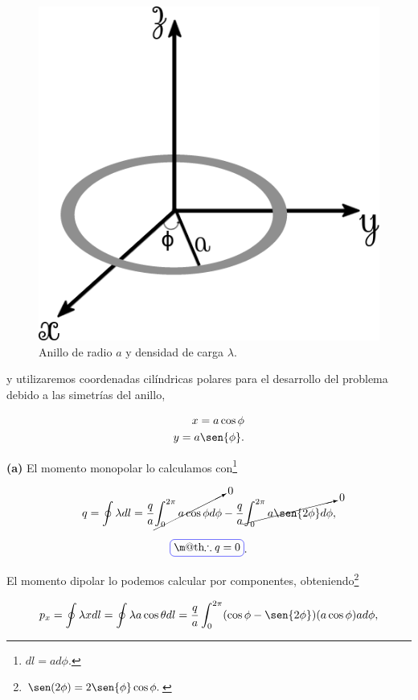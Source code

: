\documentclass[a4paper,11pt]{article}
\makeatletter
\numberwithin{equation}{section}
\newcommand*{\boxcolor}{blue}
\renewcommand{\boxed}[1]{\textcolor{\boxcolor}{%
\tikz[baseline={([yshift=-1ex]current bounding box.center)}] \node [rectangle, minimum width=1ex,rounded corners,draw] {\normalcolor\m@th$\displaystyle#1$};}}
\makeatother
\begin{document}
\begin{figure}[H]
 \center 
 \includegraphics[scale=0.5]{problema8fig1}
 \caption{Anillo de radio $a$ y densidad de carga $\lambda$.}
\end{figure}

y utilizaremos coordenadas cilíndricas polares para el desarrollo del problema debido 
a las simetrías del anillo, 

\begin{align*}
 x = a\cos{\phi} \\
 y = a\sen{\phi}.
\end{align*}

\textbf{(a)} El momento monopolar lo calculamos con\footnote{$dl = ad\phi$.}

\begin{equation}
 q = \oint \lambda dl = \frac{q}{a} \cancelto{0}{\int_0^{2\pi} a\cos{\phi}d\phi} - 
 \frac{q}{a} \cancelto{0}{\int_0^{2\pi} a\sen{2\phi}d\phi},
\end{equation}

\begin{equation}
 \boxed{\therefore q = 0}.
\end{equation}

El momento dipolar lo podemos calcular por componentes, obteniendo\footnote{
$\sen(2\phi) = 2 \sen{\phi}\cos{\phi}.$}

\begin{equation}
 p_x = \oint \lambda x dl = \oint \lambda a\cos{\theta} dl = 
 \frac{q}{a}\int_0^{2\pi} (\cos{\phi} - \sen{2\phi})(a\cos{\phi}) ad\phi,
\end{equation}
\end{document}
